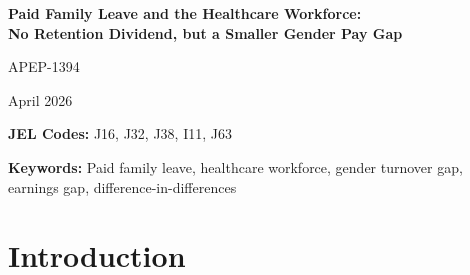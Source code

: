 \documentclass[12pt]{article}
\begin{document}
\begin{titlepage}
\begin{center}
\vspace*{1cm}

{\LARGE\bfseries Paid Family Leave and the Healthcare Workforce:\\
No Retention Dividend, but a Smaller Gender Pay Gap}

\vspace{1.5cm}

{\large APEP-1394}

\vspace{0.5cm}

{\large April 2026}

\vspace{1.5cm}

\begin{abstract}
\noindent
Does paid family leave (PFL) reduce gender gaps in healthcare workforce turnover and earnings? Using a difference-in-difference-in-differences design exploiting staggered PFL adoption across ten U.S.\ states from 2004--2024, I compare female-to-male turnover and earnings differentials in healthcare (NAICS 62) before and after policy enactment. I find no significant effect on the gender turnover gap ($\hat{\beta} = -0.0007$, $p = 0.76$), rejecting the ``retention dividend'' hypothesis. However, PFL significantly narrows the gender earnings gap by 3.3 percent ($p < 0.001$). Placebo tests on male-only outcomes and falsification on the finance sector confirm identification validity. These results indicate that PFL improves pay equity for female healthcare workers without detectably altering turnover patterns---suggesting that healthcare attrition is driven by structural workplace factors that leave policy alone cannot address.
\end{abstract}

\vspace{1cm}

\noindent \textbf{JEL Codes:} J16, J32, J38, I11, J63

\noindent \textbf{Keywords:} Paid family leave, healthcare workforce, gender turnover gap, earnings gap, difference-in-differences

\end{center}
\end{titlepage}

\section{Introduction}
\end{document}

